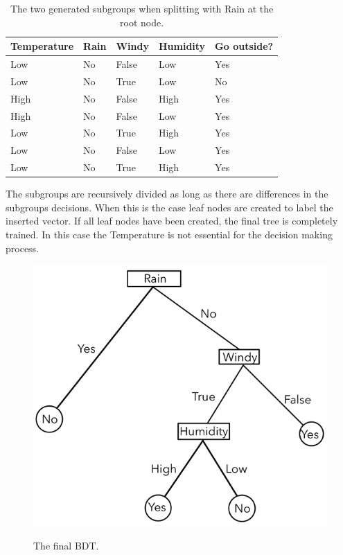 \documentclass[
12pt,
headsepline,
bibliography=totoc,
twoside=semi,
]{scrartcl}
\begin{document}
   \begin{table}[H]
      \begin{center}\begin{tabular}{|l|l|l|l||l|}
      \hline
         Temperature & Rain & Windy & Humidity & Go outside? \\
       \hline
       \hline
      Low& No & False & Low & Yes \\
      \hline
      Low& No & True & Low & No \\
      \hline
      High& No & False &  High& Yes \\
      \hline
      High& No &  False&  Low& Yes \\
      \hline
      Low&  No& True & High &  Yes\\
      \hline
      Low&  No&  False& Low & Yes \\
      \hline
      Low&  No& True& High & Yes\\
      \hline
      \end{tabular}\end{center}
      \label{fig:fig102}
      \caption{The two generated subgroups when splitting with Rain at the root node.}
      \end{table}

 The subgroups are recursively divided as long as there are differences in the subgroups decisions. When this is the case leaf nodes are created to label the inserted vector. If all leaf nodes have been created, the final tree is completely trained. In this case the Temperature is not essential for the decision making process.

 
 \begin{figure}[H]
    \centering\includegraphics[scale=0.55]{BDT11.png}\label{fig:fig11}
    \caption{The final BDT.} 
 \end{figure}
\end{document}
